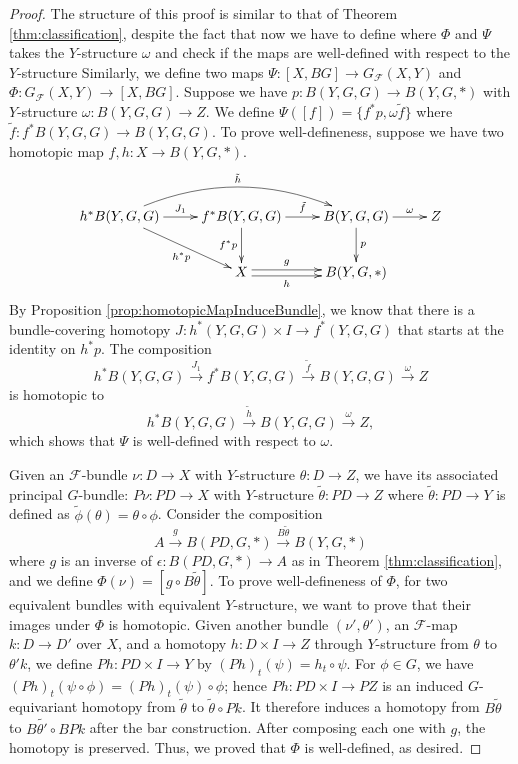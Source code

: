 \documentclass[psamsfonts]{amsart}
\theoremstyle{definition}
\theoremstyle{remark}
\numberwithin{equation}{section}
\begin{document}
\begin{proof}
The structure of this proof is similar to that of Theorem \ref{thm:classification}, despite the fact that now we have to define where $\Phi$ and $\Psi$ takes the $Y$-structure $\omega$ and check if the maps are well-defined with respect to the $Y$-structure Similarly, we define two maps $\Psi: [X, BG] \rightarrow G_{\mathcal{F}}(X, Y)$ and $\Phi: G_{\mathcal{F}}(X, Y) \rightarrow [X, BG]$. Suppose we have $p: B(Y, G, G) \rightarrow B(Y, G, *)$ with $Y$-structure $\omega: B(Y, G, G) \to Z$. We define $\Psi([f]) = \{f^{*}p, \omega\tilde{f}\}$ where $\tilde{f}: f^{*}B(Y, G, G) \to B(Y, G, G)$. To prove well-defineness, suppose we have two homotopic map $f, h: X \to B(Y, G, *).$
\[\xymatrix{
h^{*}B(Y, G, G) \ar[dr]_-{h^{*}p} \ar[r]^-{J_{1}} \ar@/^5ex/[rr]^-{\tilde{h}} & f^{*}B(Y, G, G) \ar[d]_{f^{*}p} \ar[r]^-{\tilde{f}} & B(Y, G, G)\ar[d]^{p} \ar[r]^-{\omega}& Z\\
& X \ar[r]<.5ex>^-{g} \ar[r]<-.5ex>_-{h} & B(Y, G, *) \\} \]
By Proposition \ref{prop:homotopicMapInduceBundle}, we know that there is a bundle-covering homotopy $J: h^{*}(Y, G, G) \times I \to f^{*}(Y, G, G)$ that starts at the identity on $h^{*}p$. The composition
$$ h^{*}B(Y, G, G) \xrightarrow{J_{1}} f^{*}B(Y, G, G) \xrightarrow{\tilde{f}}  B(Y, G, G) \xrightarrow{\omega} Z $$
is homotopic to $$ h^{*}B(Y, G, G) \xrightarrow{\tilde{h}} B(Y, G, G) \xrightarrow{\omega} Z,$$ which shows that $\Psi$ is well-defined with respect to $\omega$.
 
Given an  $\mathcal{F}$-bundle $\nu: D \rightarrow X$ with $Y$-structure $\theta: D \to Z$, we have its associated principal $G$-bundle: $P\nu: PD \rightarrow X$ with $Y$-structure $\tilde{\theta}: PD \to Z$ where $\tilde{\theta}: PD \to Y$ is defined as $\tilde{\phi}(\theta) = \theta \circ \phi$. Consider the composition $$A \xrightarrow{g} B(PD, G, *) \xrightarrow{B\tilde{\theta}} B(Y, G, *)$$ where $g$ is an inverse of $\epsilon: B(PD, G, *) \to A$ as in Theorem \ref{thm:classification}, and we define $\Phi(\nu) = [g \circ B\tilde{\theta}]$. To prove well-defineness of $\Phi$, for two equivalent bundles with equivalent $Y$-structure, we want to prove that their images under $\Phi$ is homotopic. Given another bundle $(\nu', \theta')$, an $\mathcal{F}$-map $k: D \to D'$ over $X$, and a homotopy $h: D \times I \to Z$ through $Y$-structure from $\theta$ to $\theta' k$, we define $Ph: PD \times I \to Y$ by $(Ph)_{t}(\psi) = h_{t} \circ \psi$. For $\phi \in G$, we have $(Ph)_{t}(\psi \circ \phi) = (Ph)_{t}(\psi)\circ \phi$; hence $Ph: PD \times I \to PZ$ is an induced $G$-equivariant homotopy from $\tilde{\theta}$ to $\tilde{\theta} \circ Pk$. It therefore induces a homotopy from $B\tilde{\theta}$ to $B\tilde{\theta'} \circ BPk$ after the bar construction. After composing each one with $g$, the homotopy is preserved. Thus, we proved that $\Phi$ is well-defined, as desired.


\end{proof}
\end{document}
